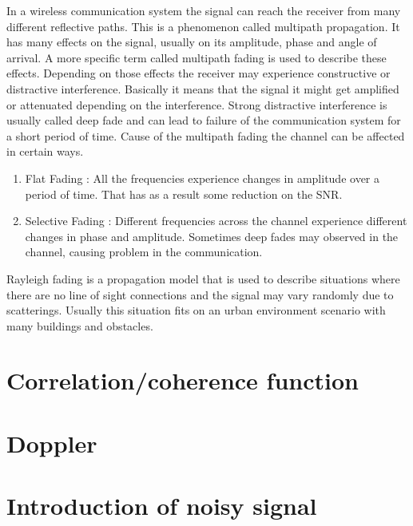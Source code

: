 In a wireless communication system the signal can reach the receiver from many different reflective paths. This is a phenomenon called multipath propagation. It has many effects on the signal, usually on its amplitude, phase and angle of arrival.\citep{Fading} A more specific term called multipath fading is used to describe these effects. Depending on those effects the receiver may experience constructive or distractive interference. Basically it means that the signal it might get amplified or attenuated depending on the interference. Strong distractive interference is usually called deep fade and can lead to failure of the communication system for a short period of time. Cause of the multipath fading the channel can be affected in certain ways.
	\begin{enumerate}
	\item Flat Fading : All the frequencies experience changes in amplitude over a period of time. That has as a result some reduction on the SNR.
	\item Selective Fading : Different frequencies across the channel experience different changes in phase and amplitude. Sometimes deep fades may observed in the channel, causing problem in the communication.\citep{FlatSelective}
	\end{enumerate}
Rayleigh fading is a propagation model that is used to describe situations where there are no line of sight connections and the signal may vary randomly due to scatterings. Usually this situation fits on an urban environment scenario with many buildings and obstacles.


\section{Correlation/coherence function}

\section{Doppler}

\section{Introduction of noisy signal}